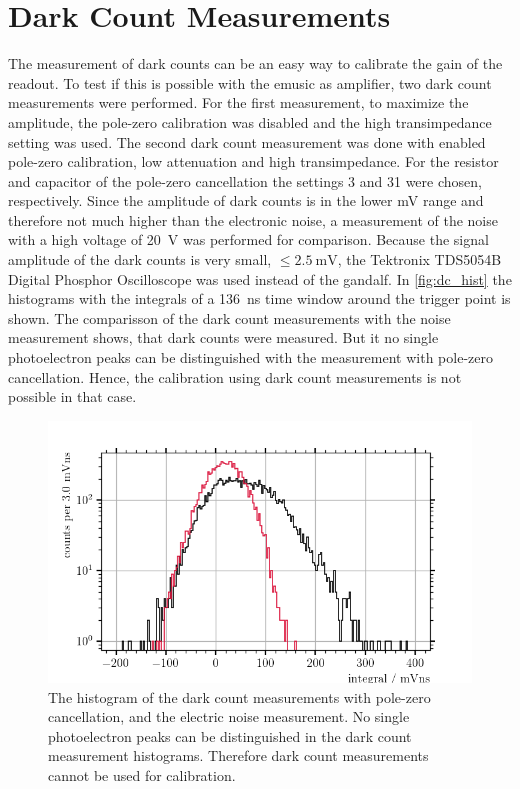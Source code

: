 \section{Dark Count Measurements}
The measurement of dark counts can be an easy way to calibrate the gain of the readout.
To test if this is possible with the \ac{emusic} as amplifier, two dark count measurements were performed.
For the first measurement, to maximize the amplitude, the pole-zero calibration was disabled and the high transimpedance setting was used.
The second dark count measurement was done with enabled pole-zero calibration, low attenuation and high transimpedance.
For the resistor and capacitor of the pole-zero cancellation the settings 3 and 31 were chosen, respectively.
Since the amplitude of dark counts is in the lower \si{\milli\volt} range and therefore not much higher than the electronic noise, a measurement of the noise with a high voltage of \SI{20}{\volt} was performed for comparison.
Because the signal amplitude of the dark counts is very small, $\leq\SI{2.5}{\milli\volt}$, the Tektronix TDS5054B Digital Phosphor Oscilloscope was used instead of the \ac{gandalf}.
In \autoref{fig:dc_hist} the histograms with the integrals of a \SI{136}{\nano\second} time window around the trigger point is shown. 
The comparisson of the dark count measurements with the noise measurement shows, that dark counts were measured.
But it no single photoelectron peaks can be distinguished with the measurement with pole-zero cancellation.
Hence, the calibration using dark count measurements is not possible in that case.
\begin{figure}
	\centering
	\includegraphics[width=1.\textwidth]{pictures/dc_hist_pz}
	\caption[Histogram of the dark count measurements with pole-zero cancellation.]{The histogram of the dark count measurements with pole-zero cancellation, and the electric noise measurement. No single photoelectron peaks can be distinguished in the dark count measurement histograms. Therefore dark count measurements cannot be used for calibration.} 
	\label{fig:dc_hist}
\end{figure}
